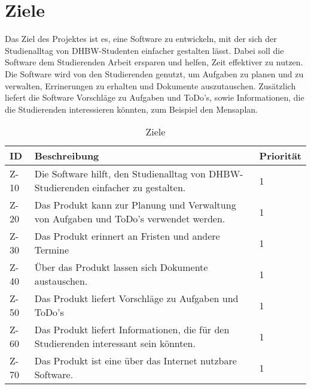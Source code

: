 
\chapter{Ziele}
Das Ziel des Projektes ist es, eine Software zu entwickeln, mit der sich der Studienalltag von DHBW-Studenten einfacher gestalten lässt. Dabei soll die Software dem Studierenden Arbeit ersparen und helfen, Zeit effektiver zu nutzen. Die Software wird von den Studierenden genutzt, um  Aufgaben zu planen und zu verwalten, Errinerungen zu erhalten und Dokumente auszutauschen. Zusätzlich liefert die Software Vorschläge zu Aufgaben und ToDo's, sowie Informationen, die die Studierenden interessieren könnten, zum Beispiel den Mensaplan. 

\begin{table}[H]
\caption{Ziele}
\label{ziele:entwicklungsziele}
\begin{tabularx}{\textwidth}{|l|X|l|}
\toprule
\textbf{ID} & \textbf{Beschreibung} & \textbf{Priorität}\\
\endhead
\hline
Z-10 & Die Software hilft, den Studienalltag von DHBW-Studierenden einfacher zu gestalten. & 1 \\
Z-20 & Das Produkt kann zur Planung und Verwaltung von Aufgaben und ToDo's verwendet werden. & 1 \\
Z-30 & Das Produkt erinnert an Fristen und andere Termine  & 1 \\
Z-40 & Über das Produkt lassen sich Dokumente austauschen. & 1 \\
Z-50 & Das Produkt liefert Vorschläge zu Aufgaben und ToDo's & 1 \\
Z-60 & Das Produkt liefert Informationen, die für den Studierenden interessant sein könnten. & 1 \\
Z-70 & Das Produkt ist eine über das Internet nutzbare Software. & 1\\
\hline
\end{tabularx}
\end{table}
